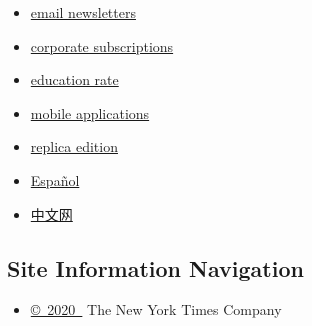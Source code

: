 \begin{itemize}
\tightlist
\item
  \href{https://web.archive.org/web/20200128165017/https://www.nytimes.com/newsletters}{email
  newsletters}
\item
  \href{https://web.archive.org/web/20200128165017/https://www.nytimes.com/corporateleftnav}{corporate
  subscriptions}
\item
  \href{https://web.archive.org/web/20200128165017/https://www.nytimes.com/educationleftnav}{education
  rate}
\end{itemize}

\begin{itemize}
\tightlist
\item
  \href{https://web.archive.org/web/20200128165017/http://www.nytimes.com/services/mobile/index.html}{mobile
  applications}
\item
  \href{https://web.archive.org/web/20200128165017/http://eedition.nytimes.com/cgi-bin/signup.cgi?cc=37FYY}{replica
  edition}
\item
  \href{https://web.archive.org/web/20200128165017/https://www.nytimes.com/es/}{Español}
\item
  \href{https://web.archive.org/web/20200128165017/https://cn.nytimes.com/}{中文网}
\end{itemize}

\hypertarget{site-information-navigation}{%
\subsection{Site Information
Navigation}\label{site-information-navigation}}

\begin{itemize}
\tightlist
\item
  \href{https://web.archive.org/web/20200128165017/https://help.nytimes.com/hc/en-us/articles/115014792127-Copyright-notice}{©~2020~}
  The New York Times Company
\end{itemize}

